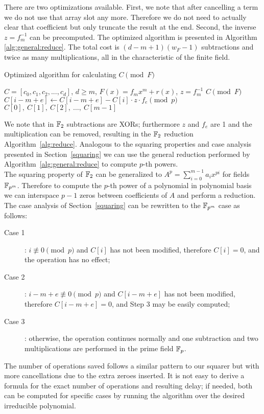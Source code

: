 There are two optimizations available. First, we note that after cancelling a term we do not use that array slot any more. Therefore we do not need to actually clear that coefficient but only truncate the result at the end. Second, the inverse $z = f_m^{-1}$ can be precomputed. The optimized algorithm is presented in Algorithm \ref{alg:general:reduce}. The total cost is $(d-m+1) (w_F-1)$ subtractions and twice as many multiplications, all in the characteristic of the finite field. \\

\begin{algorithm}
\caption{Optimized algorithm for calculating $C \pmod F$}
\label{alg:general:reduce}
\begin{algorithmic}[1]
    \REQUIRE $C = [c_0, c_1, c_2, ..., c_d]$, $d \geq m$, $F(x) = f_m x^m + r(x)$, $z = f_m^{-1}$
    \ENSURE $C \pmod F$
            \STATE $C[i-m+e] \leftarrow C[i-m+e] - C[i] \cdot z \cdot f_e \pmod p$
        \ENDFOR
    \ENDFOR
    \RETURN $C[0],~C[1],~C[2],~\ldots,~C[m-1]$
\end{algorithmic}
\end{algorithm}

We note that in $\mathbb{F}_2$ subtractions are XORs; furthermore $z$ and $f_e$ are 1 and the multiplication can be removed, resulting in the $\mathbb{F}_2$ reduction Algorithm~\ref{alg:reduce}. Analogous to the squaring properties and case analysis presented in Section~\ref{squaring} we can use the general reduction performed by Algorithm~\ref{alg:general:reduce} to compute $p$-th powers. \\

The squaring property of $\mathbb{F}_2$ can be generalized to $A^p = \sum_{i=0}^{m-1} a_i x^{pi}$ for fields $\mathbb{F}_{p^m}$. Therefore to compute the $p$-th power of a polynomial in polynomial basis we can interspace $p-1$ zeros between coefficients of $A$ and perform a reduction. The case analysis of Section~\ref{squaring} can be rewritten to the $\mathbb{F}_{p^m}$ case as follows: \\

\begin{description}
\item[Case 1]: $i \not\equiv 0 \pmod{p}$ and $C[i]$ has not been modified, therefore $C[i] = 0$, and the operation has no effect;
\item[Case 2]: $i-m+e \not\equiv 0 \pmod{p}$ and $C[i-m+e]$ has not been modified, therefore $C[i-m+e] = 0$, and Step 3 may be easily computed;
\item[Case 3]: otherwise, the operation continues normally and one subtraction and two multiplications are performed in the prime field $\mathbb{F}_p$.
\end{description}
    
The number of operations saved follows a similar pattern to our squarer but with more cancellations due to the extra zeroes inserted. It is not easy to derive a formula for the exact number of operations and resulting delay; if needed, both can be computed for specific cases by running the algorithm over the desired irreducible polynomial. \\